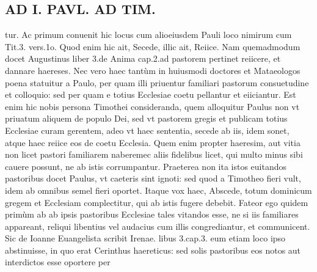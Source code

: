 \documentclass{article}
\begin{document}
\begin{pages}
\section*{AD I. PAVL. AD TIM. }
\marginpar{[ p.430 ]}\pstart tur. Ac primum conuenit hic locus cum alioeiusdem Pauli loco nimirum cum Tit.3. vers.1o. Quod enim hic ait, Secede, illic ait, Reiice. Nam quemadmodum docet Augustinus liber 3.de Anima cap.2.ad pastorem pertinet reiicere, et dannare haereses. Nec vero haec tantùm in huiusmodi doctores et Mataeologos poena statuitur a Paulo, per quam illi priuentur familiari pastorum consuetudine et colloquio: sed per quam e totius Ecclesiae coetu pellantur et eiiciantur. Est enim hic nobis persona Timothei consideranda, quem alloquitur Paulus non vt priuatum aliquem de populo Dei, sed vt pastorem gregis et publicam totius Ecclesiae curam gerentem, adeo vt haec sententia, secede ab iis, idem sonet, atque haec reiice eos de coetu Ecclesia. Quem enim propter haeresim, aut vitia non licet pastori familiarem naberemec aliis fidelibus licet, qui multo minus sibi cauere possunt, ne ab istis corrumpantur. Praeterea non ita istos euitandos pastoribus docet Paulus, vt caeteris sint ignoti: sed quod a Timotheo fieri vult, idem ab omnibus semel fieri oportet.  \pend\pstart Itaque vox haec, Abscede, totum dominicum gregem et Ecclesiam complectitur, qui ab istis fugere debebit. Fateor ego quidem primùm ab ab ipsis pastoribus Ecclesiae tales vitandos esse, ne si iis familiares appareant, reliqui libentius vel audacius cum illis congrediantur, et communicent. Sic de Ioanne Euangelista scribit Irenae. libus 3.cap.3. eum etiam loco ipso abstinuisse, in quo erat Cerinthus haereticus: sed solis pastoribus eos notos aut interdictos esse oportere per\pend

\end{pages}
\end{document}
